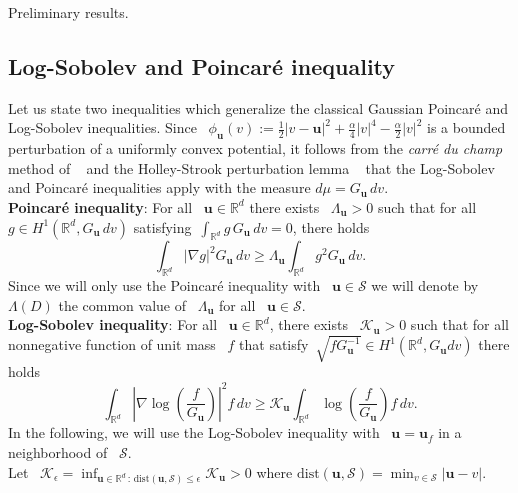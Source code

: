 \documentclass[reqno]{amsart} %
\begin{document}
\begin{section}{Preliminary results.}
\subsection{Log-Sobolev and Poincaré inequality}
Let us state two inequalities which generalize the classical Gaussian Poincaré and Log-Sobolev inequalities.  
Since~ $\phi_\mathbf{u}(v):=\frac{1}{2}|v-\mathbf{u}|^2+ \frac{\alpha}{4} |v|^4 -\frac{\alpha}{2}|v|^2$ is a bounded perturbation of a uniformly convex potential, it follows from the \emph{carré du champ} method of ~\cite{bakry1985diffusions} and the Holley-Strook perturbation lemma ~\cite{holley1987logarithmic} that the Log-Sobolev and Poincaré inequalities apply with the measure $d\mu=G_\mathbf{u} \,dv$.
\\
\textbf{Poincaré inequality}: For all~ $\mathbf{u}\in \mathbb{R}^d$ there exists ~$\Lambda_\mathbf{u}>0$ such that for all ~$g\in H^1(\mathbb{R}^d,G_\mathbf{u}\,dv)$ satisfying~$\int_{\mathbb{R}^d}g\,G_\mathbf{u} \,dv=0$, there holds 
\begin{equation}
\label{Poincaréinequality}
\tag{P}
\int_{\mathbb{R}^d} |\nabla g|^2 G_\mathbf{u}\, dv \geq \Lambda_\mathbf{u} \int_{\mathbb{R}^d} g^2 G_\mathbf{u}\, dv.
\end{equation}
Since we will only use the Poincaré inequality with~ $\mathbf{u} \in \mathcal{S}$ we will denote by~ $\Lambda(D)$ the common value of ~$\Lambda_\mathbf{u}$ for all ~$\mathbf{u} \in \mathcal{S}$.\\
\textbf{Log-Sobolev inequality}: For all~ $\mathbf{u} \in \mathbb{R}^d$, there exists ~$\mathcal{K}_\mathbf{u}>0$ such that for all nonnegative function of unit mass ~$f$ that satisfy~$\sqrt{fG_\mathbf{u}^{-1}}\in H^1(\mathbb{R}^d,G_\mathbf{u}dv)$ there holds
\begin{equation}
\label{log_sob}
\tag{LSI}
\int_{\mathbb{R}^d} \left|\nabla \log\left( \frac{f}{G_\mathbf{u}}\right)\right|^2 f\, dv \geq \mathcal{K}_\mathbf{u} \int_{\mathbb{R}^d} \log \left(\frac{f}{G_\mathbf{u}}\right) f\, dv.
\end{equation}
In the following, we will use the Log-Sobolev inequality with ~$\mathbf{u}=\mathbf{u}_{f}$ in a neighborhood of~ $\mathcal{S}$. \\
Let  ~$\mathcal{K}_{\epsilon}=\inf_{\mathbf{u} \in \mathbb{R}^d\,: \,\mathrm{dist}(\mathbf{u},\mathcal{S})\leq \epsilon} \mathcal{K}_{\mathbf{u}}>0$ where $\mathrm{dist}(\mathbf{u},\mathcal{S})=\min_{v\in \mathcal{S}}|\mathbf{u}-v|$.


\end{section}
\end{document}
